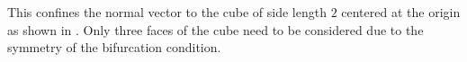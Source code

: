 \documentclass[12pt]{article}
\numberwithin{equation}{section}
\begin{document}
This confines the normal vector to the cube of side length $2$
centered at the origin as shown in . Only three
faces of the cube need to be considered due to the symmetry of the
bifurcation condition.

\begin{figure}[htbp]
  \begin{center}
    \unitlength=1.0mm

\end{center}
\end{figure}
\end{document}
